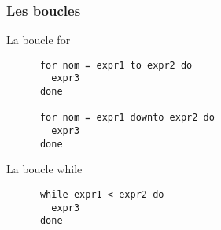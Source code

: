 \begin{frame}[fragile]
    \frametitle{Les boucles}
    \begin{block}{La boucle for}
	\begin{lstlisting}
	  for nom = expr1 to expr2 do 
	    expr3
	  done

	  for nom = expr1 downto expr2 do
	    expr3
	  done
	\end{lstlisting}
      \end{block}
	\begin{block}{La boucle while}
	\begin{lstlisting}
	  while expr1 < expr2 do
	    expr3
	  done
      \end{lstlisting}
  \end{block}
\end{frame}
